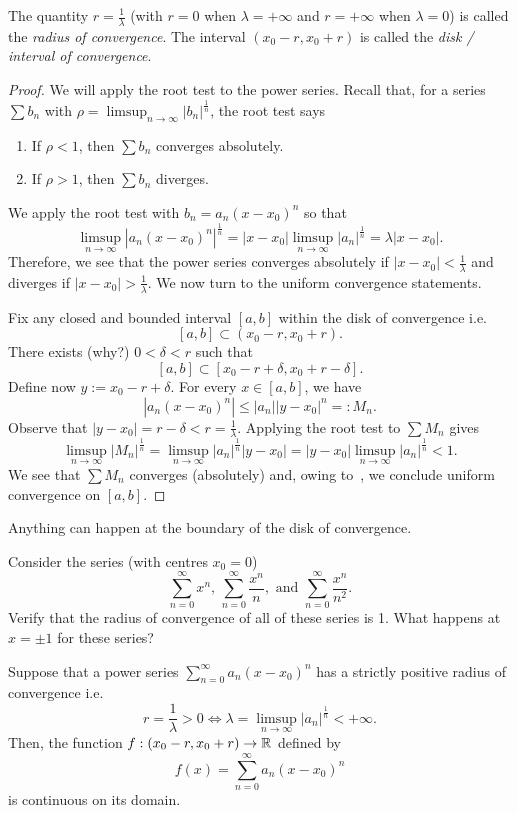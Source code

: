 The quantity $r = \frac{1}{\lambda}$ (with $r = 0$ when $\lambda = +\infty$ and $r=+\infty$ when $\lambda=0$) is called the \textit{radius of convergence}. The interval $(x_0-r,x_0+r)$ is called the \textit{disk / interval of convergence}.
\begin{proof}
	We will apply the root test to the power series. Recall that, for a series $\sum b_n$ with $\rho = \limsup_{n\to\infty}|b_n|^\frac{1}{n}$, the root test says
	\begin{enumerate}
		\item If $\rho <1$, then $\sum b_n$ converges absolutely.
		\item If $\rho>1$, then $\sum b_n$ diverges.
	\end{enumerate}
	We apply the root test with $b_n = a_n(x-x_0)^n$ so that
	\[
	\limsup_{n\to\infty}|a_n(x-x_0)^n|^\frac{1}{n} = |x-x_0|\limsup_{n\to\infty}|a_n|^\frac{1}{n} = \lambda|x-x_0|.
	\]
	Therefore, we see that the power series converges absolutely if $|x-x_0|<\frac{1}{\lambda}$ and diverges if $|x-x_0|> \frac{1}{\lambda}$. We now turn to the uniform convergence statements.
	
	Fix any closed and bounded interval $[a,b]$ within the disk of convergence i.e.
	\[
	[a,b] \subset (x_0 - r,x_0+r).
	\]
	There exists (why?) $0<\delta < r$ such that
	\[
	[a,b] \subset [x_0 - r + \delta, x_0 + r - \delta].
	\]
	Define now $y:= x_0 - r + \delta$. For every $x\in[a,b]$, we have
	\[
	|a_n(x-x_0)^n| \le |a_n| |y - x_0|^n =:M_n.
	\]
	Observe that $|y - x_0| = r - \delta < r = \frac{1}{\lambda}$. Applying the root test to $\sum M_n$ gives
	\[
	\limsup_{n\to\infty}|M_n|^\frac{1}{n} = \limsup_{n\to\infty}|a_n|^\frac{1}{n}|y-x_0| = |y-x_0|\limsup_{n\to\infty}|a_n|^\frac{1}{n} < 1.
	\]
	We see that $\sum M_n$ converges (absolutely) and, owing to~, we conclude uniform convergence on $[a,b]$.
\end{proof}
Anything can happen at the boundary of the disk of convergence.
\begin{ex}
	Consider the series (with centres $x_0 = 0$)
	\[
	\sum_{n=0}^\infty x^n,\, \sum_{n=0}^\infty \frac{x^n}{n},\text{ and }\sum_{n=0}^\infty \frac{x^n}{n^2}.
	\]
	Verify that the radius of convergence of all of these series is 1. What happens at $x=\pm 1$ for these series?
\end{ex}
\begin{thm}
	\label{thm:cty_power}
	Suppose that a power series $\sum_{n=0}^\infty a_n(x-x_0)^n$ has a strictly positive radius of convergence i.e.
	\[
	r = \frac{1}{\lambda}>0\iff \lambda = \limsup_{n\to \infty}|a_n|^\frac{1}{n} < +\infty.
	\]
	Then, the function $f:(x_0 - r,x_0+r)\to \mathbb{R}$ defined by
	\[
	f(x) = \sum_{n=0}^\infty a_n(x-x_0)^n
	\]
	is continuous on its domain.
\end{thm}
